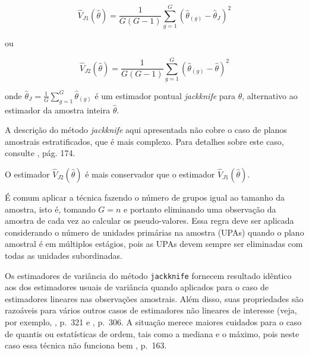 \documentclass[]{book}
\theoremstyle{definition}
\theoremstyle{definition}
\theoremstyle{definition}
\theoremstyle{remark}
\let\BeginKnitrBlock\begin \let\EndKnitrBlock\end
\begin{document}
\begin{equation}
\widehat{V}_{J1}\left( \widehat{\theta }\right) =\frac{1}{G\left( G-1\right) 
}\sum_{g=1}^{G}\left( \widehat{\theta }_{\left( g\right) }-\widehat{\theta }
_{J}\right) ^{2}  \label{eq:estpa26}
\end{equation}

ou

\begin{equation}
\widehat{V}_{J2}\left( \widehat{\theta }\right) =\frac{1}{G\left( G-1\right) 
}\sum_{g=1}^{G}\left( \widehat{\theta }_{\left( g\right) }-\widehat{\theta }
\right) ^{2}  \label{eq:estpa27}
\end{equation}

onde
\(\widehat{\theta }_{J}=\frac{1}{G}\sum_{g=1}^{G}\widehat{\theta }_{\left( g\right)}\)
é um estimador pontual \emph{jackknife} para \(\theta\), alternativo ao
estimador da amostra inteira \(\hat{\theta}\).

\BeginKnitrBlock{remark}
{}A descrição do método \emph{jackknife}
aqui apresentada não cobre o caso de planos amostrais estratificados,
que é mais complexo. Para detalhes sobre este caso, consulte
\citep{W85}, pág. 174.
\EndKnitrBlock{remark}

\BeginKnitrBlock{remark}
{}O estimador
\(\widehat{V}_{J2}\left( \widehat{\theta }\right)\) é mais conservador
que o estimador \(\widehat{V}_{J1}\left( \widehat{\theta }\right)\).
\EndKnitrBlock{remark}

\BeginKnitrBlock{remark}
{}É comum aplicar a técnica fazendo o
número de grupos igual ao tamanho da amostra, isto é, tomando \(G=n\) e
portanto eliminando uma observação da amostra de cada vez ao calcular os
pseudo-valores. Essa regra deve ser aplicada considerando o número de
unidades primárias na amostra (UPAs) quando o plano amostral é em
múltiplos estágios, pois as UPAs devem sempre ser eliminadas com todas
as unidades subordinadas.
\EndKnitrBlock{remark}

Os estimadores de variância do método \texttt{jackknife} fornecem
resultado idêntico aos dos estimadores usuais de variância quando
aplicados para o caso de estimadores lineares nas observações amostrais.
Além disso, suas propriedades são razoáveis para vários outros casos de
estimadores não lineares de interesse (veja, por exemplo,
\citep{cochran}, p.~321 e \citep{W85}, p.~306. A situação merece maiores
cuidados para o caso de quantis ou estatísticas de ordem, tais como a
mediana e o máximo, pois neste caso essa técnica não funciona bem
\citep{W85}, p.~163.
\end{document}
